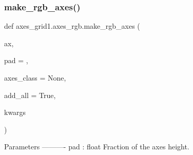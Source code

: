 \mbox{\label{namespaceaxes__grid1_1_1axes__rgb_a862f0b18b511da8369de41b9dbcb9afc}} 
\subsubsection{\texorpdfstring{make\+\_\+rgb\+\_\+axes()}{make\_rgb\_axes()}}
{\footnotesize\ttfamily def axes\+\_\+grid1.\+axes\+\_\+rgb.\+make\+\_\+rgb\+\_\+axes (\begin{DoxyParamCaption}\item[{}]{ax,  }\item[{}]{pad = {},  }\item[{}]{axes\+\_\+class = {\ttfamily None},  }\item[{}]{add\+\_\+all = {\ttfamily True},  }\item[{}]{kwargs }\end{DoxyParamCaption})}

\begin{DoxyVerb}Parameters
----------
pad : float
    Fraction of the axes height.
\end{DoxyVerb}
 